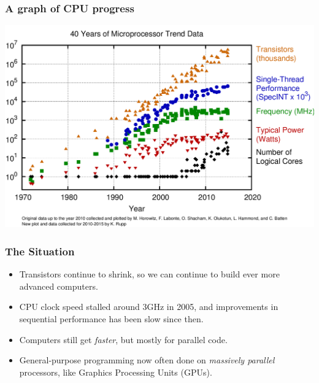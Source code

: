 \documentclass[rgb,dvipsnames]{beamer}
\begin{document}
\begin{frame}
  \frametitle{A graph of CPU progress}

  \includegraphics[width=\textwidth]{img/40-years-processor-trend.png}

\end{frame}

\begin{frame}
  \frametitle{The Situation}

  \begin{itemize}
  \item Transistors continue to shrink, so we can continue to build
    ever more advanced computers.
  \item CPU clock speed stalled around 3GHz in 2005, and improvements
    in sequential performance has been slow since then.
  \item Computers still get \textit{faster}, but mostly for parallel
    code.
  \item General-purpose programming now often done on
    \textit{massively parallel} processors, like Graphics Processing
    Units (GPUs).
  \end{itemize}

\end{frame}
\end{document}
